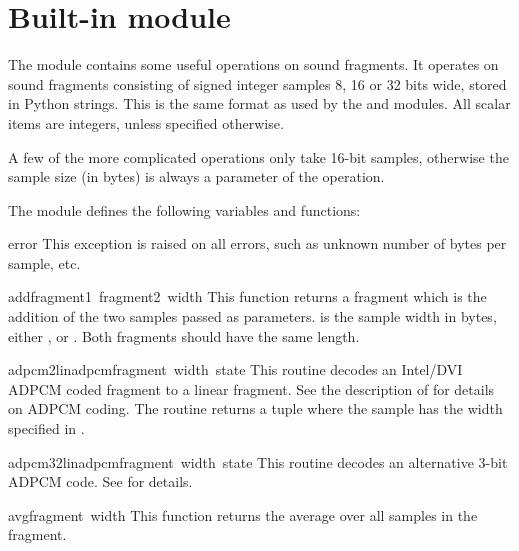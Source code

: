 \section{Built-in module }

The  module contains some useful operations on sound fragments.
It operates on sound fragments consisting of signed integer samples
8, 16 or 32 bits wide, stored in Python strings.  This is the same
format as used by the  and  modules.  All
scalar items are integers, unless specified otherwise.

A few of the more complicated operations only take 16-bit samples,
otherwise the sample size (in bytes) is always a parameter of the operation.

The module defines the following variables and functions:

\renewcommand{\indexsubitem}{(in module audioop)}
\begin{excdesc}{error}
This exception is raised on all errors, such as unknown number of bytes
per sample, etc.
\end{excdesc}

\begin{funcdesc}{add}{fragment1\, fragment2\, width}
This function returns a fragment which is the addition of the two samples
passed as parameters.  is the sample width in bytes, either
,  or . Both fragments should have the same length.
\end{funcdesc}

\begin{funcdesc}{adpcm2lin}{adpcmfragment\, width\, state}
This routine decodes an Intel/DVI ADPCM coded fragment to a linear
fragment. See the description of  for details on ADPCM
coding. The routine returns a tuple
where the sample has the width specified in .
\end{funcdesc}

\begin{funcdesc}{adpcm32lin}{adpcmfragment\, width\, state}
This routine decodes an alternative 3-bit ADPCM code. See
 for details.
\end{funcdesc}

\begin{funcdesc}{avg}{fragment\, width}
This function returns the average over all samples in the fragment.
\end{funcdesc}

